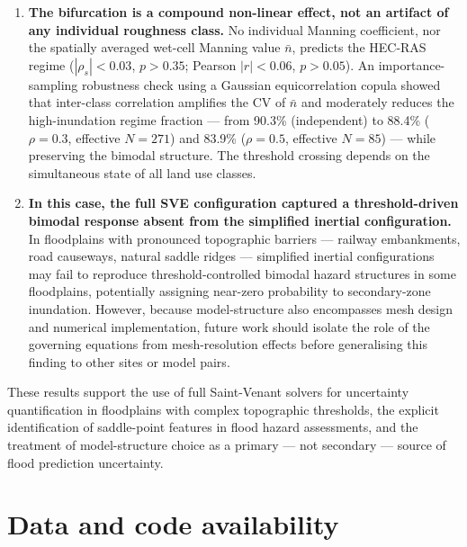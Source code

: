 \documentclass[review,12pt]{elsarticle}
\newcommand{\hecras}{\textsc{HEC-RAS}}
\begin{document}
\begin{enumerate}
  \item \textbf{The bifurcation is a compound non-linear effect, not an
        artifact of any individual roughness class.}
        No individual Manning coefficient, nor the spatially averaged
        wet-cell Manning value $\bar{n}$, predicts the \hecras{} regime
        ($|\rho_s| < 0.03$, $p > 0.35$; Pearson $|r| < 0.06$, $p > 0.05$).
        An importance-sampling robustness check using a Gaussian
        equicorrelation copula showed that inter-class correlation amplifies
        the CV of $\bar{n}$ and moderately reduces the high-inundation
        regime fraction --- from 90.3\% (independent) to 88.4\%
        ($\rho = 0.3$, effective $N = 271$) and 83.9\%
        ($\rho = 0.5$, effective $N = 85$) --- while preserving the
        bimodal structure.
        The threshold crossing depends on the simultaneous state of all
        land use classes.

  \item \textbf{In this case, the full SVE configuration captured a
        threshold-driven bimodal response absent from the simplified
        inertial configuration.}
        In floodplains with pronounced topographic barriers ---
        railway embankments, road causeways, natural saddle ridges ---
        simplified inertial configurations may fail to reproduce
        threshold-controlled bimodal hazard structures in some floodplains,
        potentially assigning near-zero probability to secondary-zone
        inundation.
        However, because model-structure also encompasses mesh design and
        numerical implementation, future work should isolate the role of
        the governing equations from mesh-resolution effects before
        generalising this finding to other sites or model pairs.

\end{enumerate}

These results support the use of full Saint-Venant solvers for uncertainty
quantification in floodplains with complex topographic thresholds, the
explicit identification of saddle-point features in flood hazard assessments,
and the treatment of model-structure choice as a primary --- not secondary ---
source of flood prediction uncertainty.

\section*{Data and code availability}
\end{document}
